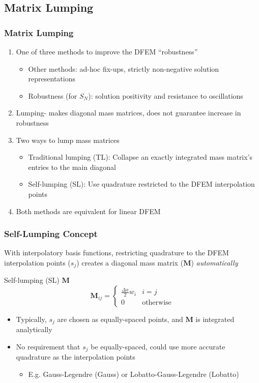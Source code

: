 \documentclass{beamer}
\newcommand{\be}{\begin{equation*}}   %
\newcommand{\ee}{\end{equation*}}
\begin{document}
\subsection{Matrix Lumping}
\begin{frame}
\frametitle{Matrix Lumping}

\begin{enumerate}
\item One of three methods to improve the DFEM ``robustness'' 
\begin{itemize}
\item Other methods: ad-hoc fix-ups, strictly non-negative solution representations
\item Robustness (for $S_N$): solution positivity and resistance to oscillations
\end{itemize}
\item Lumping- makes diagonal mass matrices, does not guarantee increase in robustness
\item Two ways to lump mass matrices
\begin{itemize}
\item Traditional lumping (TL): Collapse an exactly integrated mass matrix's entries to the main diagonal
\item Self-lumping (SL): Use quadrature restricted to the DFEM interpolation points
\end{itemize} 
\item Both methods are equivalent for linear DFEM
\end{enumerate}
\end{frame}

\begin{frame}
\frametitle{Self-Lumping Concept}
With interpolatory basis functions, restricting quadrature to the DFEM interpolation points ($s_j$) creates a diagonal mass matrix ($\mathbf{M}$) {\em automatically}
\begin{block}{Self-lumping (SL) $\mathbf{M}$}
\be
\mathbf{M}_{ij} = \left \{ \begin{array}{ll}  \frac{\Delta x }{2} w_i  & i=j \\ 0 & \text{otherwise} \end{array} \right.
\ee
\end{block}
\begin{itemize}
\item Typically, $s_j$ are chosen as equally-spaced points, and $\mathbf{M}$ is integrated analytically
\item No requirement that $s_j$ be equally-spaced, could use more accurate quadrature as the interpolation points
\begin{itemize}
\item E.g. Gauss-Legendre (Gauss) or Lobatto-Gauss-Legendre (Lobatto)
\end{itemize}
\end{itemize}
\end{frame}
\end{document}
